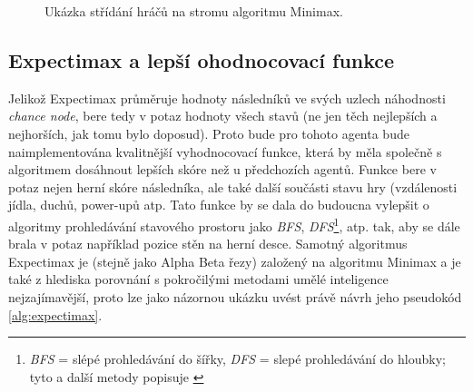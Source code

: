 \begin{figure}[!htbp]
\begin{center}
	\caption{Ukázka střídání hráčů na stromu algoritmu Minimax.}
	\label{img:playersminimax}
\end{center}
\end{figure}

\subsection{Expectimax a lepší ohodnocovací funkce}
Jelikož Expectimax průměruje hodnoty následníků ve svých uzlech náhodnosti \textit{chance node}, bere tedy v potaz hodnoty všech stavů (ne jen těch nejlepších a nejhorších, jak tomu bylo doposud). Proto bude pro tohoto agenta bude naimplementována kvalitnější vyhodnocovací funkce, která by měla společně s algoritmem dosáhnout lepších skóre než u předchozích agentů. Funkce bere v potaz nejen herní skóre následníka, ale také další součásti stavu hry (vzdálenosti jídla, duchů, power-upů atp. Tato funkce by se dala do budoucna vylepšit o algoritmy prohledávání stavového prostoru jako \textit{BFS}, \textit{DFS}\footnote{\textit{BFS} = slépé prohledávání do šířky, \textit{DFS} = slepé prohledávání do hloubky; tyto a další metody popisuje \cite{AI1}}, atp. tak, aby se dále brala v potaz například pozice stěn na herní desce. 
\newline
Samotný algoritmus Expectimax je (stejně jako Alpha Beta řezy) založený na algoritmu Minimax a je také z hlediska porovnání s pokročilými metodami umělé inteligence nejzajímavější, proto lze jako názornou ukázku uvést právě návrh jeho pseudokód \ref{alg:expectimax}.

